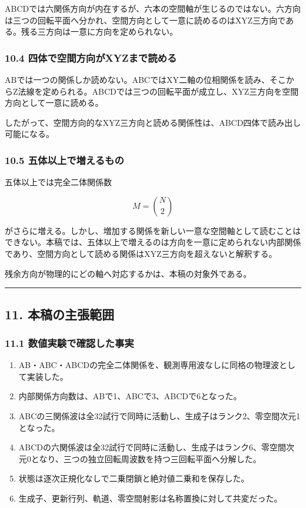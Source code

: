 \documentclass[
  10pt,
  a4paper,
]{article}
\providecommand{\tightlist}{%
  \setlength{\itemsep}{0pt}\setlength{\parskip}{0pt}}
\begin{document}
ABCDでは六関係方向が内在するが、六本の空間軸が生じるのではない。六方向は三つの回転平面へ分かれ、空間方向として一意に読めるのはXYZ三方向である。残る三方向は一意に方向を定められない。

\subsubsection{10.4
四体で空間方向がXYZまで読める}\label{ux56dbux4f53ux3067ux7a7aux9593ux65b9ux5411ux304cxyzux307eux3067ux8aadux3081ux308b}

ABでは一つの関係しか読めない。ABCではXY二軸の位相関係を読み、そこからZ法線を定められる。ABCDでは三つの回転平面が成立し、XYZ三方向を空間方向として一意に読める。

したがって、空間方向的なXYZ三方向と読める関係性は、ABCD四体で読み出し可能になる。

\subsubsection{10.5
五体以上で増えるもの}\label{ux4e94ux4f53ux4ee5ux4e0aux3067ux5897ux3048ux308bux3082ux306e}

五体以上では完全二体関係数

\[
M=\binom{N}{2}
\]

がさらに増える。しかし、増加する関係を新しい一意な空間軸として読むことはできない。本稿では、五体以上で増えるのは方向を一意に定められない内部関係であり、空間方向として読める関係はXYZ三方向を超えないと解釈する。

残余方向が物理的にどの軸へ対応するかは、本稿の対象外である。

\begin{center}\rule{0.5\linewidth}{0.5pt}\end{center}

\subsection{11.
本稿の主張範囲}\label{ux672cux7a3fux306eux4e3bux5f35ux7bc4ux56f2}

\subsubsection{11.1
数値実験で確認した事実}\label{ux6570ux5024ux5b9fux9a13ux3067ux78baux8a8dux3057ux305fux4e8bux5b9f}

\begin{enumerate}
\def\labelenumi{\arabic{enumi}.}
\tightlist
\item
  AB・ABC・ABCDの完全二体関係を、観測専用波なしに同格の物理波として実装した。
\item
  内部関係方向数は、ABで1、ABCで3、ABCDで6となった。
\item
  ABCの三関係波は全32試行で同時に活動し、生成子はランク2、零空間次元1となった。
\item
  ABCDの六関係波は全32試行で同時に活動し、生成子はランク6、零空間次元0となり、三つの独立回転周波数を持つ三回転平面へ分解した。
\item
  状態は逐次正規化なしで二乗閉鎖と絶対値二乗和を保存した。
\item
  生成子、更新行列、軌道、零空間射影は名称置換に対して共変だった。
\end{enumerate}
\end{document}
